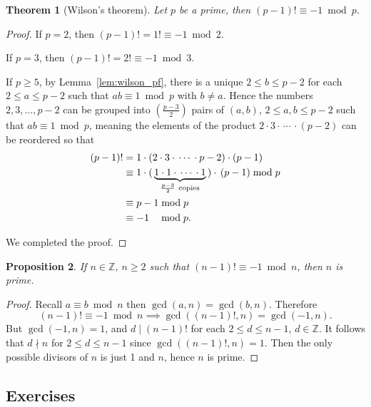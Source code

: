 \documentclass{amsbook}
\theoremstyle{plain}
\newtheorem{theorem}{Theorem}[chapter] %
\newtheorem{proposition}[theorem]{Proposition}
\theoremstyle{definition}
\theoremstyle{remark}
\numberwithin{equation}{chapter}
\numberwithin{figure}{chapter}
\newcommand{\Z}{\mathbb{Z}}
\begin{document}
\begin{theorem}[Wilson's theorem]
  Let $p$ be a prime, then $(p-1)! \equiv -1 \bmod p$.
\end{theorem}
\begin{proof}
  If $p = 2$, then $(p - 1)! = 1! \equiv -1 \bmod 2$.
  
  If $p = 3$, then $(p - 1)! = 2! \equiv -1 \bmod 3$.

  If $p \geqslant 5$, by Lemma~\ref{lem:wilson_pf}, there is a unique $2 \leqslant b \leqslant p - 2$ for each $2 \leqslant a \leqslant p - 2$ such that $ab \equiv 1 \bmod p$ with $b \neq a$. Hence the numbers $2, 3, \ldots, p - 2$ can be grouped into $\left( \frac{p-3}2 \right)$ pairs of $(a, b)$, $2 \leqslant a, b \leqslant p - 2$ such that $ab \equiv 1 \bmod p$, meaning the elements of the product $2 \cdot 3 \cdot \, \cdots \, \cdot (p - 2)$ can be reordered so that
  \begin{align}
    (p-1)! &= 1 \cdot \left( 2 \cdot 3 \cdot \, \cdots \, \cdot p-2 \right) \cdot (p - 1) \\
           &\equiv 1 \cdot (\, \underbrace{ 1 \cdot 1 \cdot \, \cdots \, \cdot 1 }_{\frac{p-3}2 {\rm ~copies}} \,) \cdot \, (p - 1) \bmod p \\
           &\equiv p-1 \bmod p \\
           &\equiv -1 \hspace{3.3mm} \bmod p.
  \end{align}

  We completed the proof.
\end{proof}

\begin{proposition}
  If $n \in \Z$, $n \geqslant 2$ such that $(n-1)! \equiv -1 \bmod n$, then $n$ is prime.
\end{proposition}
\begin{proof}
  Recall $a \equiv b \bmod n$ then $\gcd (a,n) = \gcd(b, n)$. Therefore
  \[
    (n - 1)! \equiv -1 \bmod n \implies \gcd ((n-1)!, n) = \gcd (-1, n).
  \]
  But $\gcd (-1, n) = 1$, and $d \mid (n-1)!$ for each $2 \leqslant d \leqslant n-1$, $d \in \Z$. It follows that $d \nmid n$ for $2 \leqslant d \leqslant n-1$ since $\gcd((n-1)!, n) = 1$. Then the only possible divisors of $n$ is just 1 and $n$, hence $n$ is prime.
\end{proof}

\subsection*{Exercises}
\end{document}

